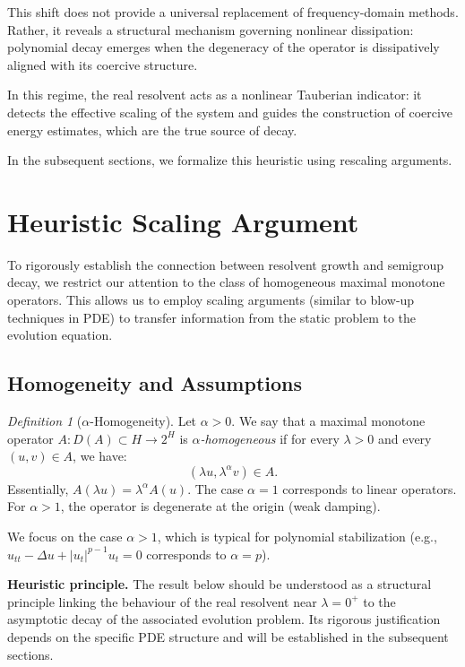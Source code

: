 \documentclass[11pt,reqno]{amsart}
\theoremstyle{remark}
\newtheorem{definition}[theorem]{Definition}
\begin{document}
This shift does not provide a universal replacement of frequency-domain methods.
Rather, it reveals a structural mechanism governing nonlinear dissipation:
polynomial decay emerges when the degeneracy of the operator is
dissipatively aligned with its coercive structure.

In this regime, the real resolvent acts as a nonlinear Tauberian indicator:
it detects the effective scaling of the system and guides the construction
of coercive energy estimates, which are the true source of decay.


In the subsequent sections, we formalize this heuristic using rescaling arguments.

\section{Heuristic Scaling Argument}\label{sec:main}
\label{sec:heuristic_scaling}

To rigorously establish the connection between resolvent growth and semigroup decay, we restrict our attention to the class of homogeneous maximal monotone operators. This allows us to employ scaling arguments (similar to blow-up techniques in PDE) to transfer information from the static problem to the evolution equation.

\subsection{Homogeneity and Assumptions}
\begin{definition}[$\alpha$-Homogeneity]
    Let $\alpha > 0$. We say that a maximal monotone operator $A: D(A) \subset H \to 2^H$ is \textit{$\alpha$-homogeneous} if for every $\lambda > 0$ and every $(u, v) \in A$, we have:
    \begin{equation}\label{eq:homogeneity}
        (\lambda u, \lambda^\alpha v) \in A.
    \end{equation}
    Essentially, $A(\lambda u) = \lambda^\alpha A(u)$. The case $\alpha=1$ corresponds to linear operators. For $\alpha > 1$, the operator is degenerate at the origin (weak damping).
\end{definition}

We focus on the case $\alpha > 1$, which is typical for polynomial stabilization (e.g., $u_{tt} - \Delta u + |u_t|^{p-1}u_t = 0$ corresponds to $\alpha = p$).


\medskip
\noindent
\textbf{Heuristic principle.}
The result below should be understood as a structural principle
linking the behaviour of the real resolvent near $\lambda=0^+$
to the asymptotic decay of the associated evolution problem.
Its rigorous justification depends on the specific PDE structure
and will be established in the subsequent sections.
\end{document}
